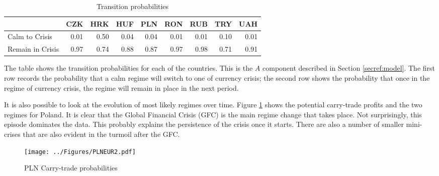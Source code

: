 \documentclass[12pt, a4paper, oneside]{article}\usepackage[]{graphicx}\usepackage[]{color}
\begin{document}
\begin{table}[t]
\begin{threeparttable}
\centering
\begin{tabular}{p{3cm}rrrrrrrr}
  \hline
& CZK & HRK & HUF & PLN & RON & RUB & TRY & UAH\\ 
  \hline
Calm to Crisis & 0.01 & 0.50 & 0.04 & 0.04 & 0.01 & 0.01 & 0.10 & 0.01\\
Remain in Crisis & 0.97 & 0.74 & 0.88 & 0.87 & 0.97 & 0.98 & 0.71 & 0.91 \\
  \hline
\end{tabular}
\begin{tablenotes}
\small
\item  The table shows the transition probabilities for each of the countries.  This is the $A$ component described in Section \ref{secref:model}. The first row records the probability that a calm regime will switch to one of currency crisis; the second row shows the probability that once in the regime of currency crisis, the regime will remain in place in the next period. 
\end{tablenotes}
\caption{Transition probabilities}
\label{tabref:transprob}
\end{threeparttable}
\end{table}

It is also possible to look at the evolution of most likely regimes over time.  Figure \ref{figref:pln} shows the potential carry-trade profits and the two regimes for Poland.  It is clear that the Global Financial Crisis (GFC) is the main regime change that takes place.  Not surprisingly, this episode dominates the data.  This probably explains the persistence of the crisis once it starts. There are also a number of smaller mini-crises that are also evident in the turmoil after the GFC. 

\begin{figure}[ht]
\centering
\texttt{[image: ../Figures/PLNEUR2.pdf]}
\caption{PLN Carry-trade probabilities}
\label{figref:pln}
\end{figure}
\end{document}
